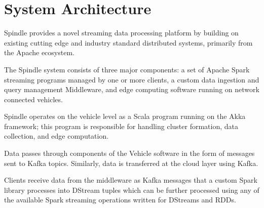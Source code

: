 \documentclass{thesis}
\begin{document}
\chapter{System Architecture}
    Spindle provides a novel streaming data processing platform by building on
    existing cutting edge and industry standard distributed systems, primarily
    from the Apache ecosystem. 

    The Spindle system consists of three major components: a set of Apache Spark %
    streaming programs managed by one or more clients, a custom data ingestion and
    query management Middleware, and edge computing software running on network
    connected vehicles.
    
    Spindle operates on the vehicle level as a Scala
    \cite{scala} program running on the Akka \cite{akka} framework; this program
    is responsible for handling cluster formation, data collection, and edge
    computation.

    Data passes through components of the Vehicle software in the form of 
    messages sent to Kafka \cite{kafka} topics. Similarly, data is transferred
    at the cloud layer using Kafka.

    Clients receive data from the middleware as Kafka messages that a custom Spark \cite{spark}
    library processes into DStream tuples which can be further processed using any of the available
    Spark streaming operations written for DStreams and RDDs.
\end{document}
